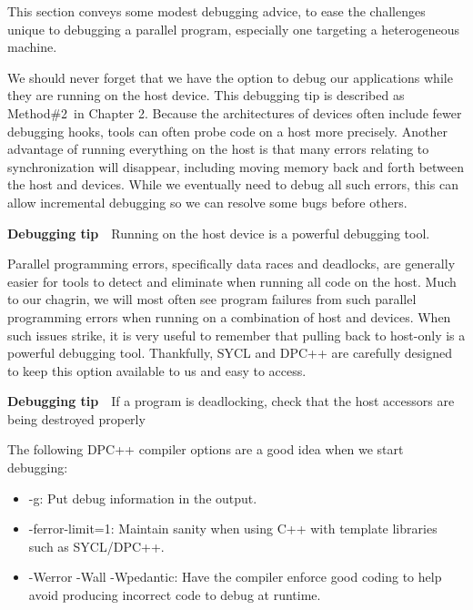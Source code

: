 This section conveys some modest debugging advice, to ease the challenges unique to debugging a parallel program, especially one targeting a heterogeneous machine.\par
We should never forget that we have the option to debug our applications while they are running on the host device. This debugging tip is described as Method\#2 in Chapter 2. Because the architectures of devices often include fewer debugging hooks, tools can often probe code on a host more precisely. Another advantage of running everything on the host is that many errors relating to synchronization will disappear, including moving memory back and forth between the host and devices. While we eventually need to debug all such errors, this can allow incremental debugging so we can resolve some bugs before others.\par

\begin{tcolorbox}[colback=red!5!white,colframe=red!75!black]
\textbf{Debugging tip} Running on the host device is a powerful debugging 
tool.
\end{tcolorbox}

Parallel programming errors, specifically data races and deadlocks, are generally easier for tools to detect and eliminate when running all code on the host. Much to our chagrin, we will most often see program failures from such parallel programming errors when running on a combination of host and devices. When such issues strike, it is very useful to remember that pulling back to host-only is a powerful debugging tool. Thankfully, SYCL and DPC++ are carefully designed to keep this option available to us and easy to access.\par

\begin{tcolorbox}[colback=red!5!white,colframe=red!75!black]
\textbf{Debugging tip} If a program is deadlocking, check that the host 
accessors are being destroyed properly
\end{tcolorbox}

The following DPC++ compiler options are a good idea when we start debugging:\par

\begin{itemize}
	\item -g: Put debug information in the output.
	\item -ferror-limit=1: Maintain sanity when using C++ with template libraries such as SYCL/DPC++.
	\item -Werror -Wall -Wpedantic: Have the compiler enforce good coding to help avoid producing incorrect code to debug at runtime.
\end{itemize}

